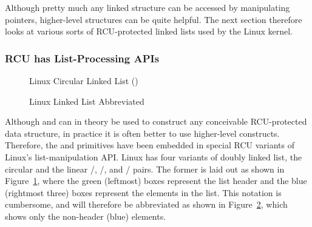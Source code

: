 Although pretty much any linked structure can be accessed by manipulating
pointers, higher-level structures can be quite helpful.
The next section therefore looks at various sorts of RCU-protected
linked lists used by the Linux kernel.

\subsubsection{RCU has List-Processing APIs}
\label{sec:defer:RCU has List-Processing APIs}

\begin{figure}[tb]
\centering
{}
\caption{Linux Circular Linked List ()}
\label{fig:defer:Linux Circular Linked List (list)}
\end{figure}

\begin{figure}[tb]
\centering
{}
\caption{Linux Linked List Abbreviated}
\label{fig:defer:Linux Linked List Abbreviated}
\end{figure}

Although  and
 can in theory be used to construct any
conceivable RCU-protected data structure, in practice it is often better
to use higher-level constructs.
Therefore, the  and
primitives have been embedded in special RCU variants of Linux's
list-manipulation API.
Linux has four variants of doubly linked list, the circular
 and the linear
/,
/, and
/
pairs.
The former is laid out as shown in
Figure~\ref{fig:defer:Linux Circular Linked List (list)},
where the green (leftmost) boxes represent the list header and the blue
(rightmost three) boxes represent the elements in the list.
This notation is cumbersome, and will therefore be abbreviated as shown in
Figure~\ref{fig:defer:Linux Linked List Abbreviated},
which shows only the non-header (blue) elements.

